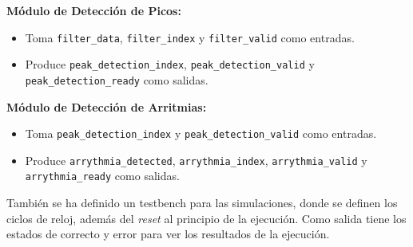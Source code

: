 \textbf{Módulo de Detección de Picos:}
\begin{itemize}
    \item Toma \texttt{filter\_data}, \texttt{filter\_index} y \texttt{filter\_valid} como entradas.
    \item Produce \texttt{peak\_detection\_index}, \texttt{peak\_detection\_valid} y \texttt{peak\_detection\_ready} como salidas.
\end{itemize}

\textbf{Módulo de Detección de Arritmias:}
\begin{itemize}
    \item Toma \texttt{peak\_detection\_index} y \texttt{peak\_detection\_valid} como entradas.
    \item Produce \texttt{arrythmia\_detected}, \texttt{arrythmia\_index}, \texttt{arrythmia\_valid} y \texttt{arrythmia\_ready} como salidas.
\end{itemize}

También se ha definido un testbench para las simulaciones, donde se definen los ciclos de reloj, además del \textit{reset} al principio de la ejecución. Como salida tiene los estados de correcto y error para ver los resultados de la ejecución.